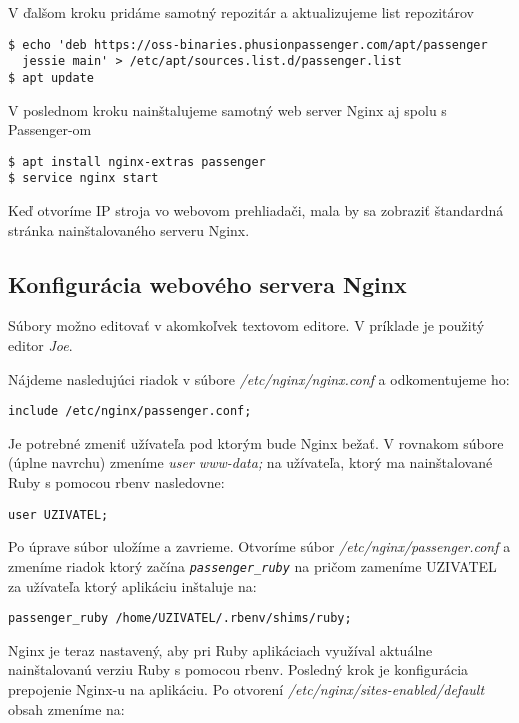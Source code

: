 V ďalšom kroku pridáme samotný repozitár a aktualizujeme list repozitárov

\begin{verbatim}
$ echo 'deb https://oss-binaries.phusionpassenger.com/apt/passenger 
  jessie main' > /etc/apt/sources.list.d/passenger.list
$ apt update
\end{verbatim}

V poslednom kroku nainštalujeme samotný web server Nginx aj spolu s Passenger-om

\begin{verbatim}
$ apt install nginx-extras passenger
$ service nginx start
\end{verbatim}

Keď otvoríme IP stroja vo webovom prehliadači, mala by sa zobraziť štandardná stránka nainštalovaného serveru Nginx. \citep{web:phusion-passenger}


\subsection*{Konfigurácia webového servera Nginx}

Súbory možno editovať v akomkoľvek textovom editore. V príklade je použitý editor \emph{Joe}.

Nájdeme nasledujúci riadok v súbore \emph{/etc/nginx/nginx.conf} a odkomentujeme ho:

\begin{verbatim}
include /etc/nginx/passenger.conf;
\end{verbatim}

Je potrebné zmeniť užívateľa pod ktorým bude Nginx bežať. V rovnakom súbore (úplne navrchu) zmeníme \emph{user www-data;} na užívateľa, ktorý ma nainštalované Ruby s pomocou rbenv nasledovne:

\begin{verbatim}
user UZIVATEL;
\end{verbatim}

Po úprave súbor uložíme a zavrieme. Otvoríme súbor \emph{/etc/nginx/passenger.conf} a zmeníme riadok ktorý začína \emph{\texttt{passenger\_ruby}} na pričom zameníme UZIVATEL za užívateľa ktorý aplikáciu inštaluje na:

\begin{verbatim}
passenger_ruby /home/UZIVATEL/.rbenv/shims/ruby;
\end{verbatim}

Nginx je teraz nastavený, aby pri Ruby aplikáciach využíval aktuálne nainštalovanú verziu Ruby s pomocou rbenv. Posledný krok je konfigurácia prepojenie Nginx-u na aplikáciu. Po otvorení \emph{/etc/nginx/sites-enabled/default} obsah zmeníme na:

